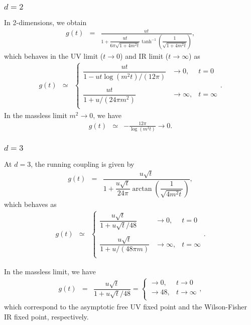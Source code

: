 \documentclass[preprint]{ptephy_v1}%
\begin{document}
\subsubsection{$d=2$}
In 2-dimensions, we obtain
\begin{eqnarray}
g(t)&=& \frac{ut}{1+\dfrac{ut}{6\pi\sqrt{1+4m^2t}}\tanh^{-1}\left(\dfrac{1}{\sqrt{1+4m^2t}}\right)},
\end{eqnarray}
which behaves in  the UV limit ($t\rightarrow 0$) and IR limit ($t\rightarrow\infty$) as
\begin{eqnarray}
g(t) &\simeq &\left\{
\begin{array}{ccc}
\dfrac{ ut}{1- u t \log (m^2 t) /(12\pi)}  & \rightarrow 0, & t=0 \\
\\
\dfrac{u t}{1+u/(24\pi m^2)} &\rightarrow \infty , & t=\infty \\
\end{array}
\right.  .
\end{eqnarray}
In the massless limit $m^2\rightarrow 0$, we have
\begin{eqnarray}
g(t) &\simeq &- \frac{12\pi}{\log (m^2 t)}\rightarrow 0.
\end{eqnarray}

\subsubsection{$d=3$}
At $d=3$, the running coupling is given by
\begin{eqnarray}
g(t) &=&\dfrac{ u\sqrt{t}}{1+\dfrac{u\sqrt{t}}{24\pi}\arctan\left(\dfrac{1}{\sqrt{4m^2 t}}\right)},
\end{eqnarray}
which behaves as
\begin{eqnarray}
g(t) &\simeq &\left\{
\begin{array}{ccc}
\dfrac{ u\sqrt{t}}{1+ u \sqrt{t}/48}  & \rightarrow 0, & t=0 \\
\\
\dfrac{u\sqrt{t}}{1+u /(48\pi m)} &\rightarrow \infty , & t=\infty \\
\end{array}
\right.  .
\end{eqnarray}

In the massless limit, we have
\begin{eqnarray}
g(t) &=& \dfrac{ u\sqrt{t}}{1+ u \sqrt{t} /48} =
\left\{
\begin{array}{cc}
\rightarrow 0, & t\rightarrow 0 \\
\rightarrow 48, & t\rightarrow\infty \\
\end{array}
\right.  ,
\end{eqnarray}
which correspond to the asymptotic free UV fixed point and the Wilson-Fisher IR fixed point, respectively.
\end{document}
